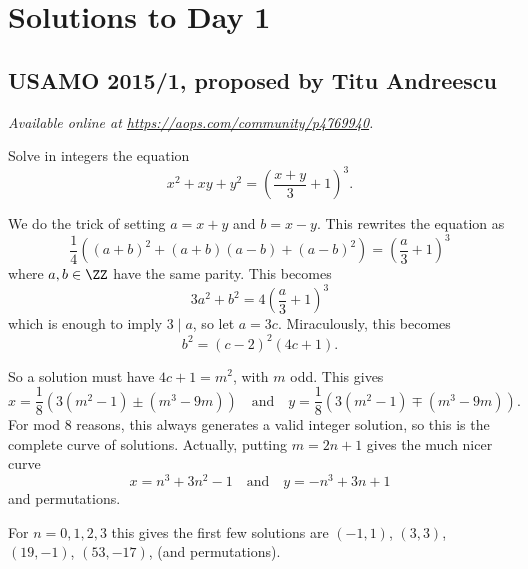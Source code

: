 \documentclass[11pt]{scrartcl}
\begin{document}
\section{Solutions to Day 1}
\subsection{USAMO 2015/1, proposed by Titu Andreescu}
\textsl{Available online at \url{https://aops.com/community/p4769940}.}
\begin{mdframed}[style=mdpurplebox,frametitle={Problem statement}]
Solve in integers the equation
\[ x^2+xy+y^2 = \left(\frac{x+y}{3}+1\right)^3. \]
\end{mdframed}
We do the trick of setting $a=x+y$ and $b=x-y$.
This rewrites the equation as
\[ \frac14\left( (a+b)^2+(a+b)(a-b)+(a-b)^2 \right)
  = \left( \frac a3 + 1 \right)^3 \]
where $a,b \in \ZZ$ have the same parity.
This becomes
\[ 3a^2+b^2 = 4\left( \frac a3 + 1 \right)^3 \]
which is enough to imply $3 \mid a$, so let $a = 3c$.
Miraculously, this becomes \[ b^2 = (c-2)^2 (4c+1). \]

So a solution must have $4c+1=m^2$, with $m$ odd.
This gives
\[ x = \frac 18 \left( 3 (m^2-1) \pm (m^3-9m)  \right)
  \quad\text{and}\quad
  y = \frac 18 \left( 3 (m^2-1) \mp (m^3-9m) \right).  \]
For mod $8$ reasons,
this always generates a valid integer solution,
so this is the complete curve of solutions.
Actually, putting $m=2n+1$ gives the much nicer curve
\[
 \boxed{x = n^3+3n^2-1
 \quad\text{and}\quad
 y = -n^3+3n+1}
\] and permutations.

For $n=0,1,2,3$ this gives the first few solutions
are $(-1,1)$, $(3,3)$, $(19,-1)$, $(53, -17)$, (and permutations).
\pagebreak
\end{document}
